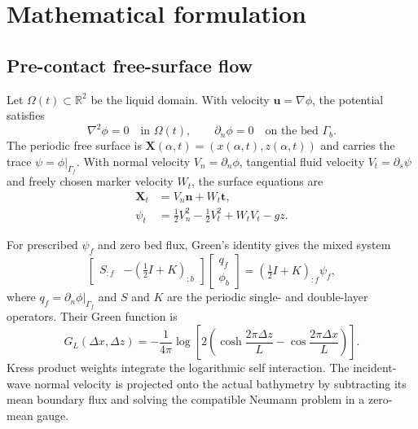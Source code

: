 \documentclass[11pt]{article}
\begin{document}
\section{Mathematical formulation}

\subsection{Pre-contact free-surface flow}

Let $\Omega(t)\subset\mathbb{R}^2$ be the liquid domain.  With velocity
$\boldsymbol u=\nabla\phi$, the potential satisfies
\begin{equation}
 \nabla^2\phi=0\quad\text{in }\Omega(t),\qquad
 \partial_n\phi=0\quad\text{on the bed }\Gamma_b.
 \label{eq:laplace}
\end{equation}
The periodic free surface is
$\boldsymbol X(\alpha,t)=(x(\alpha,t),z(\alpha,t))$ and carries the trace
$\psi=\phi|_{\Gamma_f}$.  With normal velocity $V_n=\partial_n\phi$,
tangential fluid velocity $V_t=\partial_s\psi$ and freely chosen marker
velocity $W_t$, the surface equations are
\begin{align}
 \boldsymbol X_t &= V_n\boldsymbol n+W_t\boldsymbol t,\\
 \psi_t &= \tfrac12V_n^2-\tfrac12V_t^2+W_tV_t-gz.
 \label{eq:surface-evolution}
\end{align}

For prescribed $\psi_f$ and zero bed flux, Green's identity gives the mixed
system
\begin{equation}
\begin{bmatrix}S_{:f}&-(\tfrac12I+K)_{:b}\end{bmatrix}
\begin{bmatrix}q_f\\ \phi_b\end{bmatrix}
=(\tfrac12I+K)_{:f}\psi_f,
\label{eq:mixed-bie}
\end{equation}
where $q_f=\partial_n\phi|_{\Gamma_f}$ and $S$ and $K$ are the periodic
single- and double-layer operators.  Their Green function is
\begin{equation}
G_L(\Delta x,\Delta z)=-\frac{1}{4\pi}\log\!\left[
2\left(\cosh\frac{2\pi\Delta z}{L}-
\cos\frac{2\pi\Delta x}{L}\right)\right].
\end{equation}
Kress product weights integrate the logarithmic self interaction.  The
incident-wave normal velocity is projected onto the actual bathymetry by
subtracting its mean boundary flux and solving the compatible Neumann problem
in a zero-mean gauge.
\end{document}
